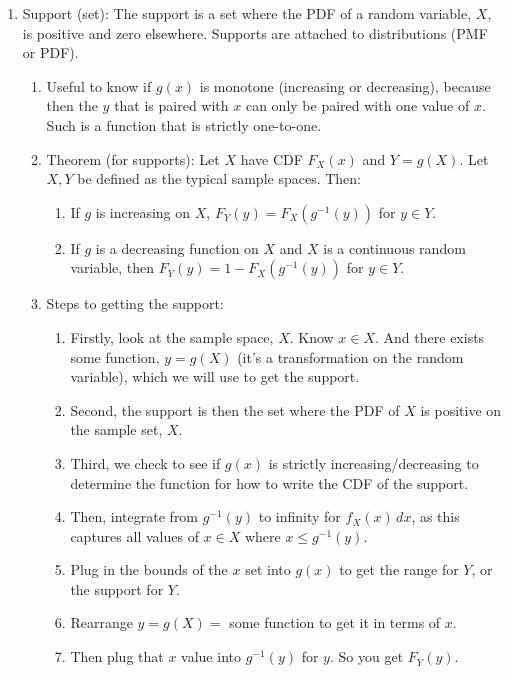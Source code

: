 \documentclass{article}
\begin{document}
\begin{enumerate}
    \item Support (set): The support is a set where the PDF of a random variable, \( X \), is positive and zero elsewhere. Supports are attached to distributions (PMF or PDF).
    \begin{enumerate}
        \item Useful to know if \( g(x) \) is monotone (increasing or decreasing), because then the \( y \) that is paired with \( x \) can only be paired with one value of \( x \). Such is a function that is strictly one-to-one.
        \item Theorem (for supports): Let \( X \) have CDF \( F_X(x) \) and \( Y = g(X) \). Let \( X, Y \) be defined as the typical sample spaces. Then:
        \begin{enumerate}
            \item If \( g \) is increasing on \( X \), \( F_Y(y) = F_X(g^{-1}(y)) \) for \( y \in Y \).
            \item If \( g \) is a decreasing function on \( X \) and \( X \) is a continuous random variable, then \( F_Y(y) = 1 - F_X(g^{-1}(y)) \) for \( y \in Y \).
        \end{enumerate}
        \item Steps to getting the support:
        \begin{enumerate}
            \item Firstly, look at the sample space, \( X \). Know \( x \in X \). And there exists some function, \( y = g(X) \) (it’s a transformation on the random variable), which we will use to get the support.
            \item Second, the support is then the set where the PDF of \( X \) is positive on the sample set, \( X \).
            \item Third, we check to see if \( g(x) \) is strictly increasing/decreasing to determine the function for how to write the CDF of the support.
            \item Then, integrate from \( g^{-1}(y) \) to infinity for \( f_X(x) \, dx \), as this captures all values of \( x \in X \) where \( x \leq g^{-1}(y) \).
            \item Plug in the bounds of the \( x \) set into \( g(x) \) to get the range for \( Y \), or the support for \( Y \).
            \item Rearrange \( y = g(X) = \) some function to get it in terms of \( x \).
            \item Then plug that \( x \) value into \( g^{-1}(y) \) for \( y \). So you get \( F_Y(y) \).

\end{enumerate}
\end{enumerate}
\end{enumerate}
\end{document}
